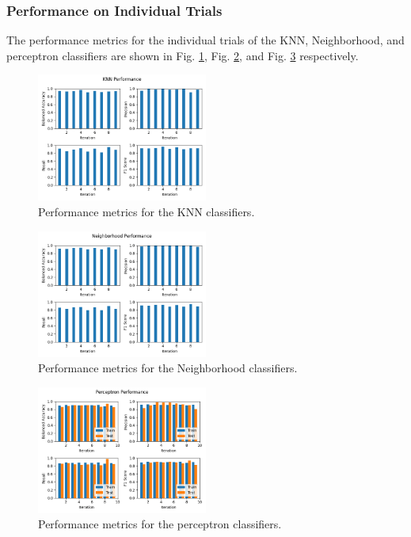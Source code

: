 \documentclass[a4paper, 11pt, titlepage]{article}
\newcommand{\figRef}[1]{Fig. \ref{#1}}
\begin{document}
  \subsubsection{Performance on Individual Trials}
  \par The performance metrics for the individual trials of the KNN,
  Neighborhood, and perceptron classifiers are shown in \figRef{fig:knn_perf},
  \figRef{fig:neighborhood_perf}, and \figRef{fig:perceptron_perf}
  respectively.
  \begin{figure}[htb]
    \centering
    \includegraphics[width=0.5\textwidth]{images/knn_performance.png}
    \caption{Performance metrics for the KNN classifiers.}
    \label{fig:knn_perf}
  \end{figure}
  \begin{figure}[htb]
    \centering
    \includegraphics[width=0.5\textwidth]{images/neighborhood_performance.png}
    \caption{Performance metrics for the Neighborhood classifiers.}
    \label{fig:neighborhood_perf}
  \end{figure}
  \begin{figure}[htb]
    \centering
    \includegraphics[width=0.5\textwidth]{images/perceptron_performance.png}
    \caption{Performance metrics for the perceptron classifiers.}
    \label{fig:perceptron_perf}
  \end{figure}
\end{document}
